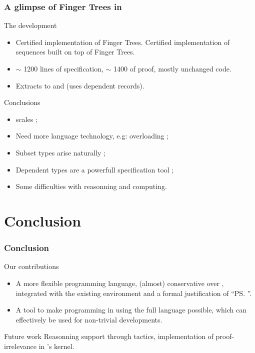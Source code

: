 \begin{frame}
  \frametitle{A glimpse of Finger Trees in \Coq}
  
  \begin{block}{The development}
    \begin{itemize}
    \item Certified implementation of Finger Trees. 
      Certified implementation of sequences built on top of Finger Trees.
    \item $\sim$ 1200 lines of specification, $\sim$ 1400 of proof, mostly unchanged
      code.
    \item Extracts to \Haskell and \ML (uses dependent records).
    \end{itemize}
  \end{block}
  \pause
  \begin{block}{Conclusions}
    \begin{itemize}
    \item \Program scales ;
    \item Need more language technology, e.g: overloading ;
    \item Subset types arise naturally ;
    \item Dependent types are a powerfull specification tool ;
    \item Some difficulties with reasonning and computing.
    \end{itemize}   
  \end{block}
  
\end{frame}

\section{Conclusion}
\begin{frame}
  \frametitle{Conclusion}
  
  \begin{block}{Our contributions}
    \begin{itemize}
    \item A more \alert{flexible} programming language, (almost) \alert{conservative} over
      \CIC, \alert{integrated} with the existing environment and a
      formal \alert{justification} of ``\ps{}''.
    \item A tool to make \alert{programming} in \Coq using the \alert{full} language
      possible, which can \alert{effectively} be used for non-trivial
      developments.
    \end{itemize}
  \end{block}
  
  \begin{block}{Future work}
    Reasonning support through tactics, implementation of
    proof-irrelevance in \Coq's kernel.
  \end{block}
  
\end{frame}

